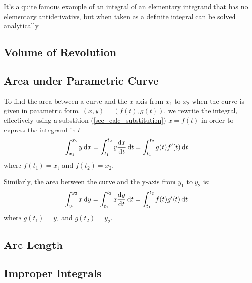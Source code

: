 It's a quite famous example of an integral of an elementary integrand that
has no elementary antiderivative, but when taken as a definite integral can
be solved analytically.

\subsection{Volume of Revolution}

\subsection{Area under Parametric Curve} \label{sec_calc_parametric_area}

To find the area between a curve and the \(x\)-axis from \(x_1\) to \(x_2\)
when the curve is given in parametric form, \((x, y) = (f(t), g(t))\),
we rewrite the integral, effectively using a substition
(\ref{sec_calc_substitution}) \(x = f(t)\) in order to express the integrand
in \(t\).
\begin{equation}
\int_{x_1}^{x_2} y \dd{x} =
 \int_{t_1}^{t_2} y \dv{x}{t} \dd{t} =
 \int_{t_1}^{t_2} g(t)f'(t) \dd{t}
\end{equation}
where \(f(t_1) = x_1\) and \(f(t_2) = x_2\).

Similarly, the area between the curve and the y-axis from \(y_1\) to \(y_2\)
is:
\begin{equation}
\int_{y_1}^{y_2} x \dd{y} =
 \int_{t_1}^{t_2} x \dv{y}{t} \dd{t} =
 \int_{t_1}^{t_2} f(t)g'(t) \dd{t}
\end{equation}
where \(g(t_1) = y_1\) and \(g(t_2) = y_2\).

\subsection{Arc Length}

\subsection{Improper Integrals}

